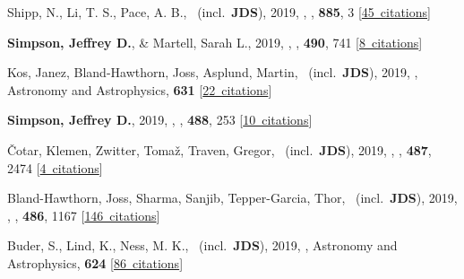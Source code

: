 \item[{\color{numcolor}\scriptsize32}] Shipp, N., Li, T. S., Pace, A. B., \etal\ (incl.\ \textbf{JDS}), 2019, , \apj, \textbf{885}, 3 [\href{https://ui.adsabs.harvard.edu/#abs/2019ApJ...885....3S}{45~citations}]

\item[{\color{numcolor}\scriptsize31}] \textbf{Simpson, Jeffrey D.}, \& Martell, Sarah L., 2019, , \mnras, \textbf{490}, 741 [\href{https://ui.adsabs.harvard.edu/#abs/2019MNRAS.490..741S}{8~citations}]

\item[{\color{numcolor}\scriptsize30}] Kos, Janez, Bland-Hawthorn, Joss, Asplund, Martin, \etal\ (incl.\ \textbf{JDS}), 2019, , Astronomy and Astrophysics, \textbf{631} [\href{https://ui.adsabs.harvard.edu/#abs/2019A&A...631A.166K}{22~citations}]

\item[{\color{numcolor}\scriptsize29}] \textbf{Simpson, Jeffrey D.}, 2019, , \mnras, \textbf{488}, 253 [\href{https://ui.adsabs.harvard.edu/#abs/2019MNRAS.488..253S}{10~citations}]

\item[{\color{numcolor}\scriptsize28}] {\v{C}}otar, Klemen, Zwitter, Toma{\v{z}}, Traven, Gregor, \etal\ (incl.\ \textbf{JDS}), 2019, , \mnras, \textbf{487}, 2474 [\href{https://ui.adsabs.harvard.edu/#abs/2019MNRAS.487.2474C}{4~citations}]

\item[{\color{numcolor}\scriptsize27}] Bland-Hawthorn, Joss, Sharma, Sanjib, Tepper-Garcia, Thor, \etal\ (incl.\ \textbf{JDS}), 2019, , \mnras, \textbf{486}, 1167 [\href{https://ui.adsabs.harvard.edu/#abs/2019MNRAS.486.1167B}{146~citations}]

\item[{\color{numcolor}\scriptsize26}] Buder, S., Lind, K., Ness, M. K., \etal\ (incl.\ \textbf{JDS}), 2019, , Astronomy and Astrophysics, \textbf{624} [\href{https://ui.adsabs.harvard.edu/#abs/2019A&A...624A..19B}{86~citations}]

